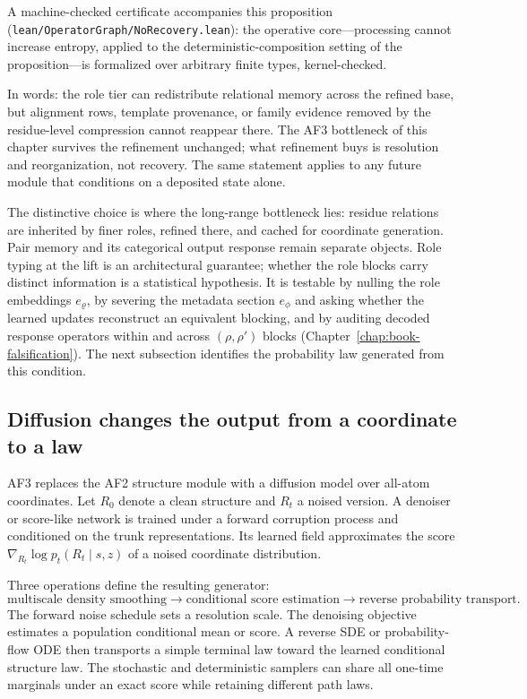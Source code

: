 A machine-checked certificate accompanies this proposition
(\texttt{lean/OperatorGraph/NoRecovery.lean}): the operative core---processing
cannot increase entropy, applied to the deterministic-composition setting of
the proposition---is formalized over arbitrary finite types, kernel-checked.

In words: the role tier can redistribute relational memory across the refined base, but
alignment rows, template provenance, or family evidence removed by the residue-level compression
cannot reappear there.  The AF3 bottleneck of this chapter survives the refinement unchanged;
what refinement buys is resolution and reorganization, not recovery.  The same statement applies
to any future module that conditions on a deposited state alone.

The distinctive choice is where the long-range bottleneck lies: residue relations are inherited
by finer roles, refined there, and cached for coordinate generation.  Pair memory and its
categorical output response remain separate objects.  Role typing at the lift is an architectural
guarantee; whether the role blocks carry distinct information is a statistical hypothesis.  It
is testable by nulling the role embeddings $e_{\varrho}$, by severing the metadata section
$e_{\phi}$ and asking whether the learned updates reconstruct an equivalent blocking, and by
auditing decoded response operators within and across $(\rho,\rho')$ blocks
(Chapter~\ref{chap:book-falsification}).  The next subsection identifies the probability law
generated from this condition.

\subsection{Diffusion changes the output from a coordinate to a law}

AF3 replaces the AF2 structure module with a diffusion model over all-atom coordinates.  Let $R_0$
denote a clean structure and $R_t$ a noised version.  A denoiser or score-like network is trained
under a forward corruption process and conditioned on the trunk representations.  Its learned
field approximates the score $\nabla_{R_t}\log p_t(R_t\mid s,z)$ of a noised coordinate
distribution.

Three operations define the resulting generator:
\begin{equation}
\boxed{
\text{multiscale density smoothing}
\longrightarrow
\text{conditional score estimation}
\longrightarrow
\text{reverse probability transport}.}
\label{eq:book-af3-diffusion-core}
\end{equation}
The forward noise schedule sets a resolution scale.  The denoising objective estimates a
population conditional mean or score.  A reverse SDE or probability-flow ODE then transports a
simple terminal law toward the learned conditional structure law.  The stochastic and deterministic
samplers can share all one-time marginals under an exact score while retaining different path laws.

